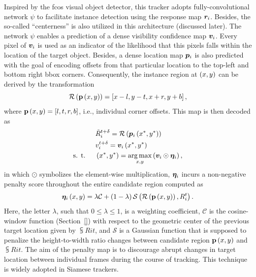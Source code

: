 Inspired by the \gls{fcos} visual object detector, this tracker adopts fully-convolutional network $\psi$ to facilitate instance detection using the response map $\bm{r}_{i}$. Besides, the so-called ``centerness'' is also utilized in this architecture (discussed later). The network $\psi$ enables a prediction of a dense visibility confidence map $\bm{v}_{i}$. Every pixel of $\bm{v}_{i}$ is used as an indicator of the likelihood that this pixels falls within the location of the target object. Besides, a dense location map $\bm{p}_{i}$ is also predicted with the goal of encoding offsets from that particular location to the top-left and bottom right \gls{bbox} corners. Consequently, the instance region at $\left( {x, y} \right)$ can be derived by the transformation
\begin{equation}
    {\mathcal{R}} \left( {\mathbf{p}} \left( x, y \right) \right) =
    \left[ {x - l, y - t, x + r, y + b} \right],
\end{equation}
where ${\mathbf{p}} \left( x, y \right) = \left[ {l, t, r, b} \right]$, i.e., individual corner offsets. This map is then decoded as
\begin{equation}
    \begin{aligned}
        &{\tilde{R}}_{i}^{t + \delta} =
        {\mathcal{R}} \left( {\bm{p}_{i}} \left( x^*, y^* \right) \right)\\
        &{v}_{i}^{t + \delta} = {\bm{v}_{i}} \left( x^*, y^* \right)\\
        \text{s. t. } \quad &\left( {x^*, y^*} \right) = \underset{x, y}{\operatorname*{arg\,max}} \left( {\bm{v}_{i} \odot \bm{\eta}_{i}} \right),
    \end{aligned}
\end{equation}
in which $\odot$ symbolizes the element-wise multiplication, $\bm{\eta}_{i}$ incurs a non-negative penalty score throughout the entire candidate region computed as
\begin{equation}
    {\bm{\eta}_{i}} \left( x, y \right) =
    \lambda \mathcal{C} +
    \left( {1 - \lambda} \right) {\mathcal{S}} \left( 
        {\mathcal{R}} \left( 
            {\mathbf{p}} \left( x, y \right)
         \right),
        {R}_{i}^{t}
     \right).
\end{equation}
Here, the letter $\lambda$, such that $0 \leq \lambda \leq 1$, is a weighting coefficient, $\mathcal{C}$ is the cosine-window function (Section~\ref{}) with respect to the geometric center of the previous target location given by $\subsup{R}{i}{t}$, and $\mathcal{S}$ is a Gaussian function that is supposed to penalize the height-to-width ratio changes between candidate region ${\mathbf{p}} \left( x, y \right)$ and $\subsup{R}{i}{t}$. The aim of the penalty map is to discourage abrupt changes in target location between individual frames during the course of tracking. This technique is widely adopted in Siamese trackers.

